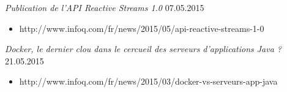 \documentclass{res}
\begin{document}
\begin{resume}
{\sl Publication de l’API Reactive Streams 1.0}  \hfill    07.05.2015 \\
\vspace{-5mm}
\begin{itemize}
\item[]  \scriptsize http://www.infoq.com/fr/news/2015/05/api-reactive-streams-1-0
\end{itemize}
\vspace{-2mm}

{\sl Docker, le dernier clou dans le cercueil des serveurs d’applications Java ?}  \hfill    21.05.2015 \\
\vspace{-5mm}
\begin{itemize}
\item[]  \scriptsize http://www.infoq.com/fr/news/2015/03/docker-vs-serveurs-app-java
\end{itemize}
\vspace{-2mm}

\end{resume}
\end{document}
